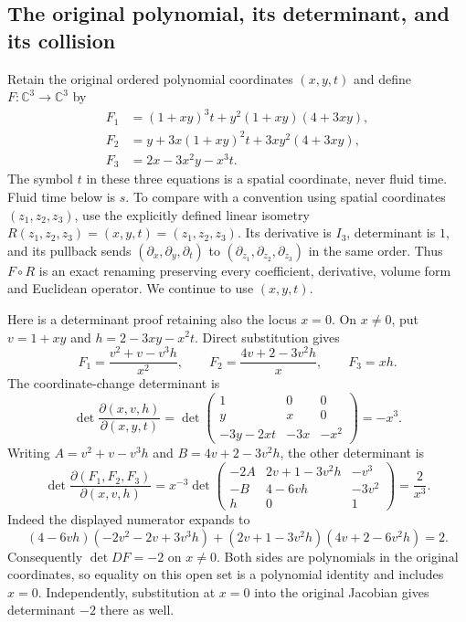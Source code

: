 \subsection{The original polynomial, its determinant, and its collision}
Retain the original ordered polynomial coordinates $(x,y,t)$ and define
$F:\mathbb C^3\longrightarrow\mathbb C^3$ by
\begin{align}
 F_1&=(1+xy)^3t+y^2(1+xy)(4+3xy),\label{eq:s6b:F1}\\
 F_2&=y+3x(1+xy)^2t+3xy^2(4+3xy),\label{eq:s6b:F2}\\
 F_3&=2x-3x^2y-x^3t.\label{eq:s6b:F3}
\end{align}
The symbol $t$ in these three equations is a spatial coordinate, never fluid
time.  Fluid time below is $s$.  To compare with a convention using spatial
coordinates $(z_1,z_2,z_3)$, use the explicitly defined linear isometry
$R(z_1,z_2,z_3)=(x,y,t)=(z_1,z_2,z_3)$.  Its derivative is $I_3$,
determinant is $1$, and its pullback sends
$(\partial_x,\partial_y,\partial_t)$ to
$(\partial_{z_1},\partial_{z_2},\partial_{z_3})$ in the same order.
Thus $F\circ R$ is an exact renaming preserving every coefficient,
derivative, volume form and Euclidean operator.  We continue to use $(x,y,t)$.

Here is a determinant proof retaining also the locus $x=0$.  On $x\ne0$,
put $v=1+xy$ and $h=2-3xy-x^2t$.  Direct substitution gives
\[
 F_1=\frac{v^2+v-v^3h}{x^2},\qquad
 F_2=\frac{4v+2-3v^2h}{x},\qquad F_3=xh.
\]
The coordinate-change determinant is
\[
 \det\frac{\partial(x,v,h)}{\partial(x,y,t)}
 =\det\begin{pmatrix}1&0&0\\y&x&0\\-3y-2xt&-3x&-x^2\end{pmatrix}
 =-x^3.
\]
Writing $A=v^2+v-v^3h$ and $B=4v+2-3v^2h$, the other determinant is
\[
 \det\frac{\partial(F_1,F_2,F_3)}{\partial(x,v,h)}
 =x^{-3}\det\begin{pmatrix}
 -2A&2v+1-3v^2h&-v^3\\
 -B&4-6vh&-3v^2\\ h&0&1
 \end{pmatrix}=\frac2{x^3}.
\]
Indeed the displayed numerator expands to
\[
 (4-6vh)(-2v^2-2v+3v^3h)
 +(2v+1-3v^2h)(4v+2-6v^2h)=2.
\]
Consequently $\det DF=-2$ on $x\ne0$.  Both sides are polynomials in the
original coordinates, so equality on this open set is a polynomial identity
and includes $x=0$.  Independently, substitution at $x=0$ into the original
Jacobian gives determinant $-2$ there as well.

